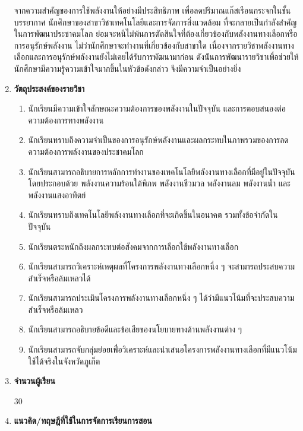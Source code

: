 \documentclass[a4paper,12pt]{article}
\begin{document}
\begin{enumerate}[label=\textbf{\arabic*},leftmargin=*]
        จากความสำคัญของการใช้พลังงานให้อย่างมีประสิทธิภาพ เพื่อลดปริมาณแก๊สเรือนกระจกในชั้นบรรยากาศ นักศึกษาของสาขาวิชาเทคโนโลยีและการจัดการสิ่งแวดล้อม ที่จะกลายเป็นกำลังสำคัญในการพัฒนาประชาคมโลก ย่อมจะหนีไม่พ้นการตัดสินใจที่ต้องเกี่ยวข้องกับพลังงานทางเลือกหรือการอนุรักษ์พลังงาน ไม่ว่านักศึกษาจะทำงานที่เกี่ยวข้องกับสาขาใด เนื่องจากรายวิชาพลังงานทางเลือกและการอนุรักษ์พลังงานยังไม่เคยได้รับการพัฒนามาก่อน ดังน้ันการพัฒนารายวิชาเพื่อช่วยให้นักศึกษามีความรู้ความเข้าใจมากขึ้นในหัวข้อดังกล่าว จึงมีความจำเป็นอย่างยิ่ง
    \item \noindent \textbf{วัตถุประสงค์ของรายวิชา} \hfill \par
    \begin{enumerate}[label=\arabic*.]
        \item นักเรียนมีความเข้าใจลักษณะความต้องการของพลังงานในปัจจุบัน และการตอบสนองต่อความต้องการทางพลังงาน
        \item นักเรียนทราบถึงความจำเป็นของการอนุรักษ์พลังงานและผลกระทบในภาพรวมของการลดความต้องการพลังงานของประชาคมโลก
        \item นักเรียนสามารถอธิบายการหลักการทำงานของเทคโนโลยีพลังงานทางเลือกที่มีอยู่ในปัจจุบัน โดยประกอบด้วย พลังงานความร้อนใต้พิภพ พลังงานชีวมวล พลังงานลม พลังงานน้ำ และพลังงานแสงอาทิตย์
        \item นักเรียนทราบถึงเทคโนโลยีพลังงานทางเลือกที่จะเกิดขึ้นในอนาคต รวมทั้งข้อจำกัดในปัจจุบัน
        \item นักเรียนตระหนักถึงผลกระทบต่อสังคมจากการเลือกใช้พลังงานทางเลือก
        \item นักเรียนสามารถวิเคราะห์เหตุผลที่โครงการพลังงานทางเลือกหนึ่ง ๆ จะสามารถประสบความสำเร็จหรือล้มเหลวได้
        \item นักเรียนสามารถประเมินโครงการพลังงานทางเลือกหนึ่ง ๆ ได้ว่ามีแนวโน้มที่จะประสบความสำเร็จหรือล้มเหลว
        \item นักเรียนสามารถอธิบายข้อดีและข้อเสียของนโยบายทางด้านพลังงานต่าง ๆ
        \item นักเรียนสามารถจับกลุ่มย่อยเพื่่อวิเคราะห์และนำเสนอโครงการพลังงานทางเลือกที่มีแนวโน้มใช้ได้จริงในจังหวัดภูเก็ต
    \end{enumerate}
    \item \noindent \textbf{จำนวนผู้เรียน} \hfill \par
        30
    \item \noindent \textbf{แนวคิด/ทฤษฎีที่ใช้ในการจัดการเรียนการสอน} \hfill \par
        \begin{enumerate}[label=\arabic*.]

\end{enumerate}
\end{enumerate}
\end{document}

